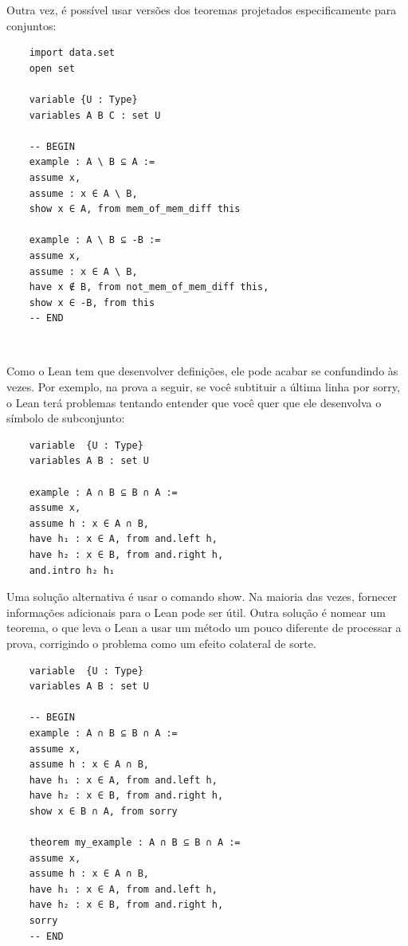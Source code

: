 Outra vez, é possível usar versões dos teoremas projetados especificamente para conjuntos:

\begin{lstlisting}
    import data.set
    open set

    variable {U : Type}
    variables A B C : set U

    -- BEGIN
    example : A \ B ⊆ A :=
    assume x,
    assume : x ∈ A \ B,
    show x ∈ A, from mem_of_mem_diff this

    example : A \ B ⊆ -B :=
    assume x,
    assume : x ∈ A \ B,
    have x ∉ B, from not_mem_of_mem_diff this,
    show x ∈ -B, from this
    -- END

\end{lstlisting}

$\qquad$

Como o Lean tem que desenvolver definições, ele pode acabar se confundindo às vezes. Por exemplo, na prova a seguir, se você subtituir a última linha por{
\selectfont sorry}, o Lean terá problemas tentando entender que você quer que ele desenvolva o símbolo de subconjunto:

\begin{lstlisting}
    variable  {U : Type}
    variables A B : set U

    example : A ∩ B ⊆ B ∩ A :=
    assume x,
    assume h : x ∈ A ∩ B,
    have h₁ : x ∈ A, from and.left h,
    have h₂ : x ∈ B, from and.right h,
    and.intro h₂ h₁

\end{lstlisting}

Uma solução alternativa é usar o comando{
\selectfont show}. Na maioria das vezes, fornecer informações adicionais para o Lean pode ser útil. Outra solução é nomear um teorema, o que leva o Lean a usar um método um pouco diferente de processar a prova, corrigindo o problema como um efeito colateral de sorte.

\begin{lstlisting}
    variable  {U : Type}
    variables A B : set U

    -- BEGIN
    example : A ∩ B ⊆ B ∩ A :=
    assume x,
    assume h : x ∈ A ∩ B,
    have h₁ : x ∈ A, from and.left h,
    have h₂ : x ∈ B, from and.right h,
    show x ∈ B ∩ A, from sorry

    theorem my_example : A ∩ B ⊆ B ∩ A :=
    assume x,
    assume h : x ∈ A ∩ B,
    have h₁ : x ∈ A, from and.left h,
    have h₂ : x ∈ B, from and.right h,
    sorry
    -- END

\end{lstlisting}
